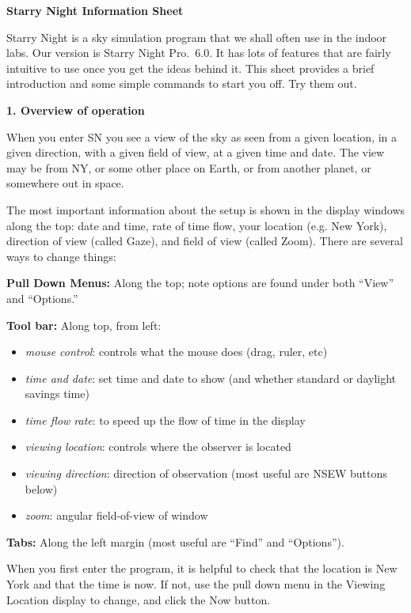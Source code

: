 \noindent
{\hfill \Large {\bf Starry Night Information Sheet} \hfill}


\bigskip

\noindent
Starry Night is a sky simulation program that we shall often use in
the indoor labs. Our version is Starry Night Pro.\ 6.0. It has lots of
features that are fairly intuitive to use once you get the ideas
behind it. This sheet provides a brief introduction and some simple
commands to start you off. Try them out.

\bigskip
\noindent
{\bf 1. Overview of operation}

\smallskip
\noindent
When you enter SN you see a view of the sky as seen from a given
location, in a given direction, with a given field of view,
at a given time and date. The view may be from NY,
or some other place on Earth, or from another planet, or somewhere out
in space.

The most important information about the setup is
shown in the display windows along the top: date and time, rate of
time flow, your location (e.g. New York), direction of view (called
Gaze), and field of view (called Zoom). There are several ways to
change things:

\medskip
{\bf Pull Down Menus:} Along the top; note options are found
under both ``View'' and ``Options.''

\medskip
{\bf Tool bar:} Along top, from left:
\begin{itemize}
\item {\it mouse control}: controls what the mouse does (drag, ruler,
  etc)
\item {\it time and date}: set time and date to show (and whether
  standard or daylight savings time)
\item {\it time flow rate}: to speed up the flow of time in the
  display
\item {\it viewing location}: controls where the observer is located
\item {\it viewing direction}: direction of observation (most useful
  are NSEW buttons below)
\item {\it zoom}: angular field-of-view of window
\end{itemize}

\medskip
{\bf Tabs:} Along the left margin (most useful are ``Find'' and
``Options'').
\medskip

\medskip
\noindent
When you first enter the program, it is helpful to check that the
location is New York and that the time is now. If not, use the pull
down menu in the Viewing Location display to change, and click the Now button.

